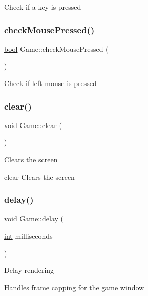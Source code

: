 Check if a key is pressed \mbox{\label{class_game_a3713033ec8d0e8bb80c6cb9fdbb596df}} 
\subsubsection{\texorpdfstring{checkMousePressed()}{checkMousePressed()}}
{\footnotesize\ttfamily \mbox{\hyperlink{asdl_8h_af6a258d8f3ee5206d682d799316314b1}{bool}} Game\+::check\+Mouse\+Pressed (\begin{DoxyParamCaption}{ }\end{DoxyParamCaption})}

Check if left mouse is pressed \mbox{\label{class_game_a8ba8d7bcda356ed584dc445184320ff7}} 
\subsubsection{\texorpdfstring{clear()}{clear()}}
{\footnotesize\ttfamily \mbox{\hyperlink{_s_d_l__opengles2__gl2ext_8h_ae5d8fa23ad07c48bb609509eae494c95}{void}} Game\+::clear (\begin{DoxyParamCaption}{ }\end{DoxyParamCaption})}

Clears the screen

clear Clears the screen \mbox{\label{class_game_a922b044ea75b008453028c334d8a6978}} 
\subsubsection{\texorpdfstring{delay()}{delay()}}
{\footnotesize\ttfamily \mbox{\hyperlink{_s_d_l__opengles2__gl2ext_8h_ae5d8fa23ad07c48bb609509eae494c95}{void}} Game\+::delay (\begin{DoxyParamCaption}\item[{\mbox{\hyperlink{warnings_8h_a74f207b5aa4ba51c3a2ad59b219a423b}{int}}}]{milliseconds }\end{DoxyParamCaption})}

Delay rendering

Handles frame capping for the game window \mbox{\label{class_game_a01f5a8eef42666769787945e2aa24305}} 
